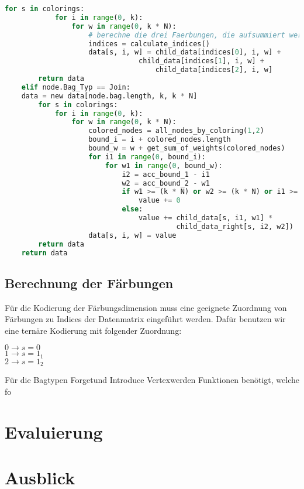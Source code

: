 \begin{svgraybox}
\begin{lstlisting}[language=python,label={code:pseudo}, caption=Pseudocode für das dynamische Programm]
        for s in colorings:
            for i in range(0, k):
                for w in range(0, k * N):
                    # berechne die drei Faerbungen, die aufsummiert werden
                    indices = calculate_indices()
                    data[s, i, w] = child_data[indices[0], i, w] +
                    		    child_data[indices[1], i, w] +
                                    child_data[indices[2], i, w]
        return data
    elif node.Bag_Typ == Join:
	data = new data[node.bag.length, k, k * N]
        for s in colorings:
            for i in range(0, k):
                for w in range(0, k * N):
                    colored_nodes = all_nodes_by_coloring(1,2)
                    bound_i = i + colored_nodes.length
                    bound_w = w + get_sum_of_weights(colored_nodes)
                    for i1 in range(0, bound_i):
                        for w1 in range(0, bound_w):
                            i2 = acc_bound_1 - i1
                            w2 = acc_bound_2 - w1
                            if w1 >= (k * N) or w2 >= (k * N) or i1 >= k or i2 >= k:
                                value += 0
                            else:
                                value += child_data[s, i1, w1] *   
                                         child_data_right[s, i2, w2])
                    data[s, i, w] = value
        return data
    return data

\end{lstlisting}
\end{svgraybox}

\subsection{Berechnung der Färbungen}
\label{ssec:colors}
Für die Kodierung der Färbungsdimension muss eine geeignete Zuordnung von Färbungen zu Indices der Datenmatrix eingeführt werden. Dafür benutzen wir eine ternäre Kodierung mit folgender Zuordnung:
\begin{center}
$0 \rightarrow s=0$\\
$1 \rightarrow s=1_1$\\
$2 \rightarrow s=1_2$\\
\end{center}
Für die Bagtypen \glqq Forget\grqq und \glqq Introduce Vertex\grqq werden Funktionen benötigt, welche fo
\section{Evaluierung}
\label{sec:eval}

\section{Ausblick}
\label{sec:outlook}
